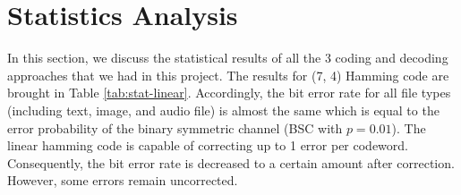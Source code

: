 \documentclass{article}
\begin{document}
% 

% 

% 
% 
% 

% 

% 

\section{Statistics Analysis}

In this section, we discuss the statistical results of all the 3 coding and decoding approaches that we had in this project. The results for (7, 4) Hamming code are brought in Table \ref{tab:stat-linear}. Accordingly, the bit error rate for all file types (including text, image, and audio file) is almost the same which is equal to the error probability of the binary symmetric channel (BSC with $p = 0.01$). The linear hamming code is capable of correcting up to 1 error per codeword. Consequently, the bit error rate is decreased to a certain amount after correction. However, some errors remain uncorrected. 
\end{document}
